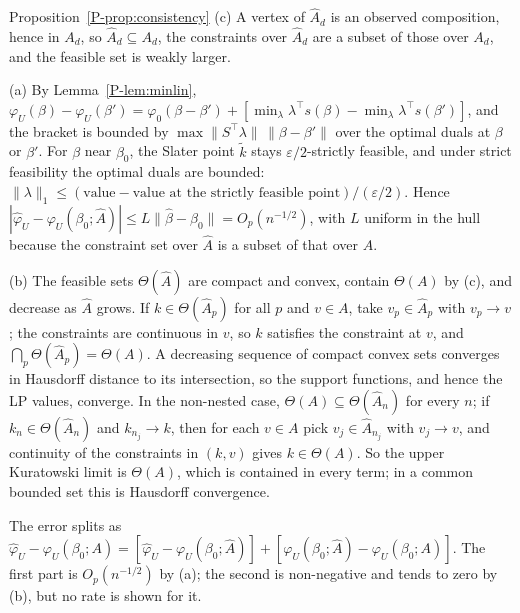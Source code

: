 \begin{proofof}{Proposition~\ref{P-prop:consistency}}
(c) A vertex of $\hat A_d$ is an observed composition, hence in $A_d$, so
$\hat A_d\subseteq A_d$, the constraints over $\hat A_d$ are a subset of those over $A_d$,
and the feasible set is weakly larger.

(a) By Lemma~\ref{P-lem:minlin},
$\varphi_U(\beta)-\varphi_U(\beta')=\varphi_0(\beta-\beta')+[\min_\lambda\lambda^\top
s(\beta)-\min_\lambda\lambda^\top s(\beta')]$, and the bracket is bounded by
$\max\|S^\top\lambda\|\,\|\beta-\beta'\|$ over the optimal duals at $\beta$ or $\beta'$.
For $\beta$ near $\beta_0$, the Slater point $\tilde k$ stays $\varepsilon/2$-strictly
feasible, and under strict feasibility the optimal duals are bounded:
$\|\lambda\|_1\le(\text{value}-\text{value at the strictly feasible point})/(\varepsilon/2)$.
Hence $|\hat\varphi_U-\varphi_U(\beta_0;\hat A)|\le L\|\hat\beta-\beta_0\|=O_p(n^{-1/2})$,
with $L$ uniform in the hull because the constraint set over $\hat A$ is a subset of that
over $A$.

(b) The feasible sets $\Theta(\hat A)$ are compact and convex, contain $\Theta(A)$ by (c),
and decrease as $\hat A$ grows. If $k\in\Theta(\hat A_p)$ for all $p$ and $v\in A$, take
$v_p\in\hat A_p$ with $v_p\to v$; the constraints are continuous in $v$, so $k$ satisfies
the constraint at $v$, and $\bigcap_p\Theta(\hat A_p)=\Theta(A)$. A decreasing sequence of
compact convex sets converges in Hausdorff distance to its intersection, so the support
functions, and hence the LP values, converge. In the non-nested case,
$\Theta(A)\subseteq\Theta(\hat A_n)$ for every $n$; if $k_n\in\Theta(\hat A_n)$ and
$k_{n_j}\to k$, then for each $v\in A$ pick $v_j\in\hat A_{n_j}$ with $v_j\to v$, and
continuity of the constraints in $(k,v)$ gives $k\in\Theta(A)$. So the upper Kuratowski
limit is $\Theta(A)$, which is contained in every term; in a common bounded set this is
Hausdorff convergence.
\end{proofof}

The error splits as $\hat\varphi_U-\varphi_U(\beta_0;A)=[\hat\varphi_U-\varphi_U(\beta_0;\hat
A)]+[\varphi_U(\beta_0;\hat A)-\varphi_U(\beta_0;A)]$. The first part is $O_p(n^{-1/2})$ by
(a); the second is non-negative and tends to zero by (b), but no rate is shown for it.

